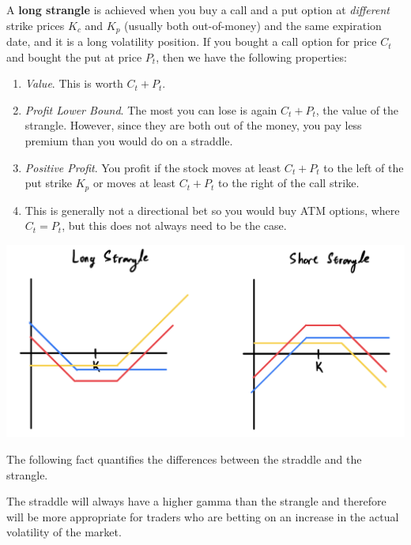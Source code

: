 \documentclass{article}
\begin{document}
    \begin{definition}[Strangles]
      A \textbf{long strangle} is achieved when you buy a call and a put option at \textit{different} strike prices $K_c$ and $K_p$ (usually both out-of-money) and the same expiration date, and it is a long volatility position. If you bought a call option for price $C_t$ and bought the put at price $P_t$, then we have the following properties: 
      \begin{enumerate}
        \item \textit{Value}. This is worth $C_t + P_t$. 
        \item \textit{Profit Lower Bound}. The most you can lose is again $C_t + P_t$, the value of the strangle. However, since they are both out of the money, you pay less premium than you would do on a straddle. 
        \item \textit{Positive Profit}. You profit if the stock moves at least $C_t + P_t$ to the left of the put strike $K_p$ or moves at least $C_t + P_t$ to the right of the call strike. 
        \item This is generally not a directional bet so you would buy ATM options, where $C_t = P_t$, but this does not always need to be the case. 
      \end{enumerate}
      \begin{center}
        \includegraphics[scale=0.3]{img/strangle.png}
      \end{center}
    \end{definition}

    The following fact quantifies the differences between the straddle and the strangle. 

    \begin{theorem}
      The straddle will always have a higher gamma than the strangle and therefore will be more appropriate for traders who are betting on an increase in the actual volatility of the market. 
    \end{theorem}
\end{document}
